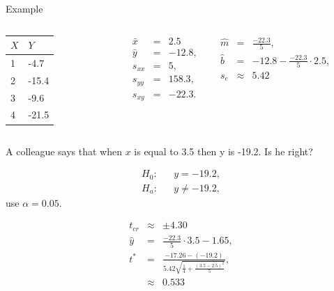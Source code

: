 \begin{frame}{Example}

  \vspace*{-4em}

    \begin{columns}

      \begin{tabular}{l|l}
        $X$ & $Y$ \\ \hline
        1 &  -4.7 \\
        2 & -15.4  \\
        3 &  -9.6 \\
        4 & -21.5 
      \end{tabular}


      \begin{eqnarray*}
        \bar{x} & = & 2.5 \\
        \bar{y} & = & -12.8, \\
        s_{xx} & = & 5, \\
        s_{yy} & = & 158.3, \\
        s_{xy} & = & -22.3.
      \end{eqnarray*}


      \begin{eqnarray*}
        \hat{m} & = & \frac{-22.3}{5}, \\
        \hat{b} & = & -12.8 - \frac{-22.3}{5} \cdot 2.5, \\
        s_e & \approx & 5.42
      \end{eqnarray*}

      \begin{eqnarray*}
      \end{eqnarray*}

    \end{columns}


    \vfill 


    A colleague says that when $x$ is equal to 3.5 then y is -19.2. Is
    he right?

      {
        \begin{eqnarray*}
          H_0: & & y=-19.2, \\
          H_a: & & y\neq -19.2,
        \end{eqnarray*}
        use $\alpha=0.05$.
      }

      {
        \begin{eqnarray*}
          t_{cr} & \approx & \pm 4.30 \\
          \hat{y} & = & \frac{-22.3}{5} \cdot 3.5 - 1.65, \\
          t^* & = & \frac{-17.26-(-19.2)}{5.42\sqrt{\frac{1}{4} + \frac{(3.5-2.5)^2}{5}}}, \\
          & \approx &  0.533
        \end{eqnarray*}
      }



\end{frame}
